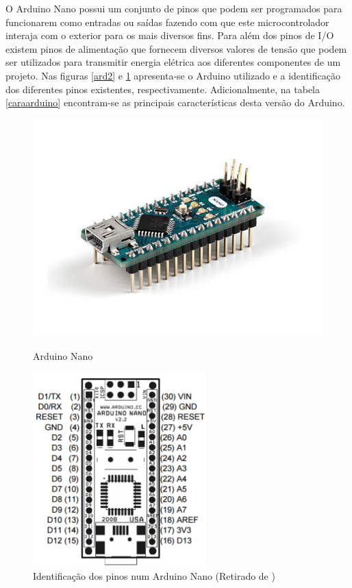 O Arduino Nano possui um conjunto de pinos que podem ser programados para funcionarem como entradas ou saídas fazendo com que este  microcontrolador interaja com o exterior para os mais diversos fins. Para além dos pinos de \ac{I/O} existem pinos de alimentação que fornecem diversos valores de tensão que podem ser utilizados para transmitir energia elétrica aos diferentes componentes de um projeto\cite{Banzi2012}. Nas figuras \ref{ard2} e \ref{ard1} apresenta-se o Arduino utilizado e a identificação dos diferentes pinos existentes, respectivamente. Adicionalmente, na tabela \ref{caraarduino} encontram-se as principais características desta versão do Arduino.



\begin{figure}[h]
	\centering
	\begin{minipage}[b]{0.49\textwidth}
		\centering
		\includegraphics[width=\textwidth]{img/hardware/nano-img.jpg}
		\caption{Arduino Nano}
		\label{ard2}
	\end{minipage}
	\hfill
	\begin{minipage}[b]{0.49\textwidth}
		\centering
		\includegraphics[width=0.6\textwidth]{img/hardware/nano-esquema.png}
		\caption[Identificação dos pinos num Arduino Nano]{Identificação dos pinos num Arduino Nano (Retirado de \cite{arduinonanouser})}
		\label{ard1}
	\end{minipage}
\end{figure}





